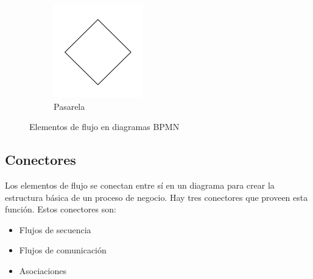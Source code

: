 \begin{figure}[H]
\begin{subfigure}[b]{0.2\textwidth}
        \includegraphics[width=\textwidth]{img/bpmn-gateway.png}
        \caption{Pasarela}
    \end{subfigure}
    \caption{Elementos de flujo en diagramas BPMN}
    \label{fig:bpmn-elements}
\end{figure}

\subsection{Conectores}

Los elementos de flujo se conectan entre sí en un diagrama para crear la estructura básica de un proceso de negocio.
Hay tres conectores que proveen esta función.
Estos conectores son:

\begin{itemize}
    \item Flujos de secuencia
    \item Flujos de comunicación
    \item Asociaciones
\end{itemize}


